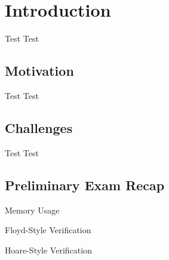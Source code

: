 \section{Introduction}
\begin{frame}{Test}
  Test
\end{frame}


\subsection{Motivation}
\begin{frame}{Test}
  Test
\end{frame}


\subsection{Challenges}
\begin{frame}{Test}
  Test
\end{frame}


\subsection{Preliminary Exam Recap}
\begin{frame}{Memory Usage}
\end{frame}

\begin{frame}{Floyd-Style Verification}
\end{frame}

\begin{frame}{Hoare-Style Verification}
\end{frame}
